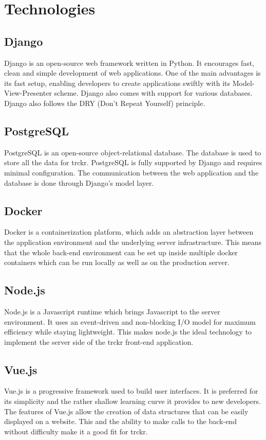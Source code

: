 \documentclass[bibliography=totoc, listof=totocnumbered]{scrartcl}
\begin{document}
\section{Technologies}
\subsection{Django}
Django is an open-source web framework written in Python.\cite{django} It
encourages fast, clean and simple development of web applications. One of the
main advantages is its fast setup, enabling developers to create applications
swiftly with its Model-View-Presenter scheme. Django also comes with support for
various databases. Django also follows the DRY (Don't Repeat Yourself)
principle.

\subsection{PostgreSQL}
PostgreSQL is an open-source object-relational database.\cite{postgre} The
database is used to store all the data for trckr. PostgreSQL is fully supported
by Django and requires minimal configuration. The communication between the web
application and the database is done through Django's model layer.

\subsection{Docker}
Docker is a containerization platform, which adds an abstraction layer between
the application environment and the underlying server
infrastructure\cite{docker}. This means that the whole back-end environment can
be set up inside multiple docker containers which can be run locally as well as
on the production server.

\subsection{Node.js}
Node.js is a Javascript runtime which brings Javascript to the server
environment.\cite{nodejs} It uses an event-driven and non-blocking I/O model for
maximum efficiency while staying lightweight. This makes node.js the ideal
technology to implement the server side of the trckr front-end application.

\subsection{Vue.js}
Vue.js is a progressive framework used to build user interfaces\cite{vuejs}. It
is preferred for its simplicity and the rather shallow learning curve it
provides to new developers. The features of Vue.js allow the creation of data
structures that can be easily displayed on a website. This and the ability to
make calls to the back-end without difficulty make it a good fit for trckr.
\end{document}
